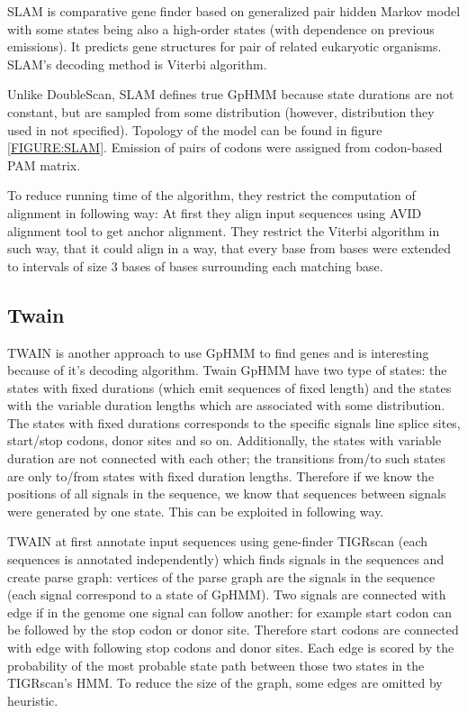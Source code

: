SLAM \cite{SLAM2003}  is comparative gene finder based on generalized pair
hidden Markov model \cite{Alexanderson2004} with some states being also a
high-order states (with dependence on previous emissions).  It predicts gene
structures for pair of related eukaryotic organisms. SLAM's decoding method is
Viterbi algorithm. 

Unlike DoubleScan, SLAM defines true GpHMM because state durations are not
constant, but are sampled from some distribution (however, distribution they
used in not specified). Topology of the model can be found in figure
\ref{FIGURE:SLAM}.
Emission of pairs of codons were assigned from codon-based PAM matrix.


To reduce running time of the algorithm, they restrict the computation of
alignment in following way: At first they  align input sequences using AVID
alignment tool\cite{Bray2003} to get anchor alignment. They restrict the Viterbi
algorithm in such way, that it could align  in a way, that every base from
bases were extended to intervals of size $3$ bases of bases surrounding each
matching base.



\subsection{Twain}

TWAIN is another approach to use GpHMM to find genes \cite{Majoros2005} and is
interesting because of it's decoding algorithm. Twain GpHMM have two type of
states: the states with fixed durations (which emit sequences of fixed length)
and the states with the variable duration lengths which are associated with some
distribution.  The states with fixed durations corresponds to the specific
signals line splice sites, start/stop codons, donor sites and so on.
Additionally, the states with variable duration are not connected with each
other; the transitions from/to such states are only to/from states with fixed
duration lengths. Therefore if we know the positions of all signals in the
sequence, we know that sequences between signals were generated by one state.
This can be exploited in following way.

TWAIN at first annotate input sequences using gene-finder TIGRscan
\cite{Majoros2004} (each sequences is annotated independently) which finds
signals in the sequences and create parse graph: vertices of the parse graph are
the signals in the sequence (each signal correspond to a state of GpHMM).  Two
signals are connected with edge if in the genome one signal can follow another:
for example start codon can be followed by the stop codon or donor site.
Therefore start codons are connected with edge with following stop codons and
donor sites. Each edge is scored by the probability of the most probable state
path between those two states in the TIGRscan's HMM. To reduce the size of the
graph, some edges are omitted by heuristic.

